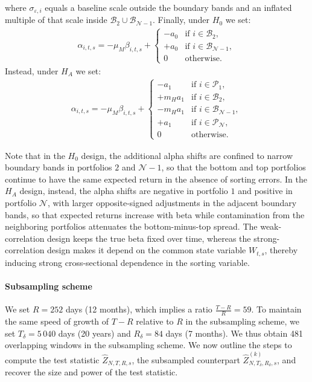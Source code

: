 where $\sigma_{\varepsilon,i}$ equals a baseline scale outside the boundary bands and an inflated multiple of that scale inside $\mathcal{B}_2 \cup \mathcal{B}_{\mathcal{N}-1}$. Finally, under $H_{0}$ we set:
    \begin{align*}
        \alpha_{i,t,s}
        =
        -\mu_M \beta_{i,t,s}
        +
        \begin{cases}
            -a_{0} & \text{if } i \in \mathcal{B}_{2},\\
            +a_{0} & \text{if } i \in \mathcal{B}_{\mathcal{N}-1},\\
            0 & \text{otherwise.}
        \end{cases}
    \end{align*}
Instead, under $H_{A}$ we set:
    \begin{align*}
        \alpha_{i,t,s}
        =
        -\mu_M \beta_{i,t,s}
        +
        \begin{cases}
            -a_{1} & \text{if } i \in \mathcal{P}_{1},\\
            +m_{H} a_{1} & \text{if } i \in \mathcal{B}_{2},\\
            -m_{H} a_{1} & \text{if } i \in \mathcal{B}_{\mathcal{N}-1},\\
            +a_{1} & \text{if } i \in \mathcal{P}_{\mathcal{N}},\\
            0 & \text{otherwise.}
        \end{cases}
    \end{align*}

Note that in the $H_{0}$ design, the additional alpha shifts are confined to narrow boundary bands in portfolios $2$ and $\mathcal{N}-1$, so that the bottom and top portfolios continue to have the same expected return in the absence of sorting errors. In the $H_{A}$ design, instead, the alpha shifts are negative in portfolio $1$ and positive in portfolio $\mathcal{N}$, with larger opposite-signed adjustments in the adjacent boundary bands, so that expected returns increase with beta while contamination from the neighboring portfolios attenuates the bottom-minus-top spread. The weak-correlation design keeps the true beta fixed over time, whereas the strong-correlation design makes it depend on the common state variable $W_{t,s}$, thereby inducing strong cross-sectional dependence in the sorting variable.


\paragraph{Subsampling scheme} We set $R=252$ days (12 months), which implies a ratio $\frac{T-R}{R} = 59$. To maintain the same speed of growth of $T-R$ relative to $R$ in the subsampling scheme, we set $T_\delta = 5\,040$ days (20 years) and $R_\delta = 84$ days (7 months). We thus obtain 481 overlapping windows in the subsampling scheme. We now outline the steps to compute the test statistic $\widehat{Z}_{N,T,R,s}$, the subsampled counterpart $\widehat{Z}_{N,T_\delta,R_\delta,s}^{(k)}$, and recover the size and power of the test statistic. 

